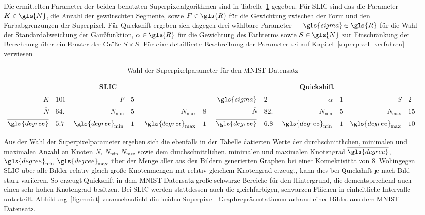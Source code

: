 Die ermittelten Parameter \bzgl{} der beiden benutzten Superpixelalgorithmen sind in Tabelle~\ref{tab:mnist} gegeben.
Für \gls{SLIC} sind das die Parameter $K \in \gls{N}$, \dhe{} die Anzahl der gewünschten Segmente, sowie $F \in \gls{R}$ für die Gewichtung zwischen der Form und den Farbabgrenzungen der Superpixel.
Für Quickshift ergeben sich dagegen drei wählbare Parameter — $\gls{sigma} \in \gls{R}$ für die Wahl der Standardabweichung der Gaußfunktion, $\alpha \in \gls{R}$ für die Gewichtung des Farbterms sowie $S \in \gls{N}$ zur Einschränkung der Berechnung über ein Fenster der Größe $S \times S$.
Für eine detaillierte Beschreibung der Parameter sei auf Kapitel~\ref{superpixel_verfahren} verwiesen.
\begin{table}[t]
\centering
\begin{tabular}{rlrlrlrlrlrl}
  \toprule
  \multicolumn{6}{c}{\gls{SLIC}} & \multicolumn{6}{c}{Quickshift}\\
  \midrule
  $K$ & $100$ & $F$ & $5$ & & & $\gls{sigma}$ & $2$ & $\alpha$ & $1$ & $S$ & $2$\\
  \midrule
  $\overline{N}$ & $64.6$ & $N_{\min}$ & $50$ & $N_{\max}$ & $80$ & $\overline{N}$ & $82.1$ & $N_{\min}$ & $5$ & $N_{\max}$ & $154$\\
  $\overline{\gls{degree}}$ & $5.7$ & $\gls{degree}_{\min}$ & $1$ & $\gls{degree}_{\max}$ & $19$ & $\overline{\gls{degree}}$ & $6.8$ & $\gls{degree}_{\min}$ & $1$ & $\gls{degree}_{\max}$ & $101$\\
  \bottomrule
\end{tabular}
\caption[Superpixelparameter für den \gls{MNIST} Datensatz]{Wahl der Superpixelparameter für den \gls{MNIST} Datensatz}
\label{tab:mnist}
\end{table}

Aus der Wahl der Superpixelparameter ergeben sich die ebenfalls in der Tabelle datierten Werte der durchschnittlichen, minimalen und maximalen Anzahl an Knoten $\overline{N}$, $N_{\min}$ \bzw{} $N_{\max}$ sowie dem durchschnittlichen, minimalen und maximalen Knotengrad $\overline{\gls{degree}}$, $\gls{degree}_{\min}$ \bzw{} $\gls{degree}_{\max}$ über der Menge aller aus den Bildern generierten Graphen bei einer Konnektivität von $8$.
Wohingegen \gls{SLIC} über alle Bilder relativ gleich große Knotenmengen mit relativ gleichem Knotengrad erzeugt, kann dies bei Quickshift je nach Bild stark variieren.
So erzeugt Quickshift in dem \gls{MNIST} Datensatz \bspw{} große schwarze Bereiche für den Hintergrund, die dementsprechend auch einen sehr hohen Knotengrad besitzen.
Bei \gls{SLIC} werden stattdessen auch die gleichfarbigen, schwarzen Flächen in einheitliche Intervalle unterteilt.
Abbildung~\ref{fig:mnist} veranschaulicht die beiden Superpixel- \bzw{} Graphrepräsentationen anhand eines Bildes aus dem \gls{MNIST} Datensatz.



